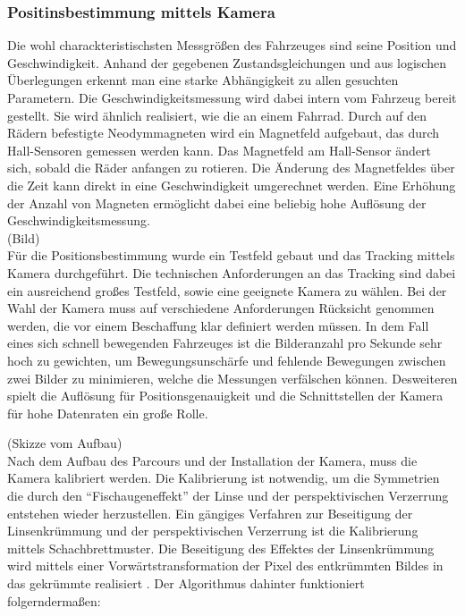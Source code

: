\subsubsection{Positinsbestimmung mittels Kamera}
Die wohl charackteristischsten Messgrößen des Fahrzeuges sind seine Position und Geschwindigkeit. Anhand der gegebenen Zustandsgleichungen und aus logischen Überlegungen erkennt man eine starke Abhängigkeit zu allen gesuchten Parametern. Die Geschwindigkeitsmessung wird dabei intern vom Fahrzeug bereit gestellt. Sie wird ähnlich realisiert, wie die an einem Fahrrad. Durch auf den Rädern befestigte Neodymmagneten wird ein Magnetfeld aufgebaut, das durch Hall-Sensoren gemessen werden kann. Das Magnetfeld am Hall-Sensor ändert sich, sobald die Räder anfangen zu rotieren. Die Änderung des Magnetfeldes über die Zeit kann direkt in eine Geschwindigkeit umgerechnet werden. Eine Erhöhung der Anzahl von Magneten ermöglicht dabei eine beliebig hohe Auflösung der Geschwindigkeitsmessung. \\

(Bild)\\ 

Für die Positionsbestimmung wurde ein Testfeld gebaut und das Tracking mittels Kamera durchgeführt. Die technischen Anforderungen an das Tracking sind dabei ein ausreichend großes Testfeld, sowie eine geeignete Kamera zu wählen. Bei der Wahl der Kamera muss auf verschiedene Anforderungen Rücksicht genommen werden, die vor einem Beschaffung klar definiert werden müssen. In dem Fall eines sich schnell bewegenden Fahrzeuges ist die Bilderanzahl pro Sekunde sehr hoch zu gewichten, um Bewegungsunschärfe und fehlende Bewegungen zwischen zwei Bilder zu minimieren, welche die Messungen verfälschen können. Desweiteren spielt die Auflösung für Positionsgenauigkeit und die Schnittstellen der Kamera für hohe Datenraten ein große Rolle. 

(Skizze vom Aufbau)\\

Nach dem Aufbau des Parcours und der Installation der Kamera, muss die Kamera kalibriert werden. Die Kalibrierung ist notwendig, um die Symmetrien die durch den "`Fischaugeneffekt"' der Linse und der perspektivischen Verzerrung entstehen wieder herzustellen. Ein gängiges Verfahren zur Beseitigung der Linsenkrümmung und der perspektivischen Verzerrung ist die Kalibrierung mittels Schachbrettmuster. Die Beseitigung des Effektes der Linsenkrümmung wird mittels einer Vorwärtstransformation der Pixel des entkrümmten Bildes in das gekrümmte realisiert \cite{Zhang}. Der Algorithmus dahinter funktioniert folgerndermaßen:

